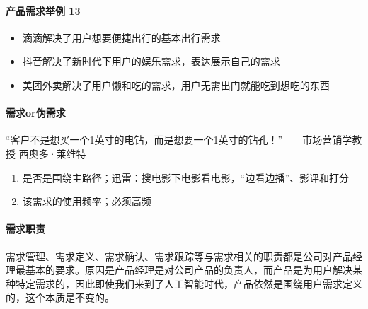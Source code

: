 \documentclass[letterpaper,11pt,english]{sphinxmanual}
\begin{document}
\paragraph{产品需求举例 13\sphinxfootnotemark[7]}
\label{\detokenize{chapter_introduction/need:id3}}%
\begin{footnotetext}[7]\sphinxAtStartFootnote
{}
%
\end{footnotetext}\ignorespaces \begin{itemize}
\item {} 
滴滴解决了用户想要便捷出行的基本出行需求

\item {} 
抖音解决了新时代下用户的娱乐需求，表达展示自己的需求

\item {} 
美团外卖解决了用户懒和吃的需求，用户无需出门就能吃到想吃的东西

\end{itemize}


\paragraph{需求or伪需求}
\label{\detokenize{chapter_introduction/need:or}}
“客户不是想买一个1英寸的电钻，而是想要一个1英寸的钻孔！”——市场营销学教授
西奥多·莱维特
\begin{enumerate}
%
\item {} 
是否是围绕主路径；迅雷：搜电影\sphinxhyphen{}下电影\sphinxhyphen{}看电影，“边看边播”、影评和打分%
\begin{footnote}[8]\sphinxAtStartFootnote
{}
%
\end{footnote}

\item {} 
该需求的使用频率；必须高频

\end{enumerate}


\paragraph{需求职责}
\label{\detokenize{chapter_introduction/need:id4}}
需求管理、需求定义、需求确认、需求跟踪等与需求相关的职责都是公司对产品经理最基本的要求。原因是产品经理是对公司产品的负责人，而产品是为用户解决某种特定需求的，因此即使我们来到了人工智能时代，产品依然是围绕用户需求定义的，这个本质是不变的。%
\begin{footnote}[9]\sphinxAtStartFootnote
{}
%
\end{footnote}
\end{document}
